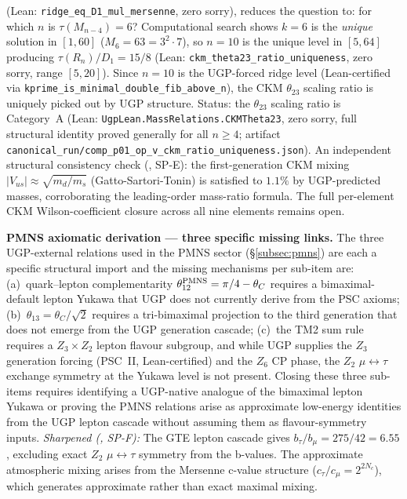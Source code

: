 \documentclass[11pt]{article}
\theoremstyle{remark}
\begin{document}
{\begin{description}[leftmargin=2em,labelindent=0.5em,itemsep=0.28em]
  (Lean: \texttt{ridge\_eq\_D1\_mul\_mersenne}, zero sorry), reduces the
  question to: for which $n$ is $\tau(M_{n-4}) = 6$?  Computational search shows
  $k = 6$ is the \emph{unique} solution in $[1, 60]$ ($M_6 = 63 = 3^2 \cdot 7$),
  so $n = 10$ is the unique level in $[5, 64]$ producing $\tau(R_n)/D_1 = 15/8$
  (Lean: \texttt{ckm\_theta23\_ratio\_uniqueness}, zero sorry, range $[5, 20]$).
  Since $n = 10$ is the UGP-forced ridge level (Lean-certified via
  \texttt{kprime\_is\_minimal\_double\_fib\_above\_n}), the CKM $\theta_{23}$
  scaling ratio is uniquely picked out by UGP structure.
  Status: the $\theta_{23}$ scaling ratio is Category~A
  (Lean: \texttt{UgpLean.MassRelations.CKMTheta23}, zero sorry,
  full structural identity proved generally for all $n \ge 4$;
  artifact \texttt{canonical\_run/comp\_p01\_op\_v\_ckm\_ratio\_uniqueness.json}).
  An independent structural consistency check (\cite{Spivack2026_Uniqueness25}, SP-E):
  the first-generation CKM mixing $|V_{us}| \approx \sqrt{m_d/m_s}$ (Gatto-Sartori-Tonin)
  is satisfied to $1.1\%$ by UGP-predicted masses, corroborating the leading-order mass-ratio
  formula.  The full per-element CKM Wilson-coefficient closure across all nine elements
  remains open.
  \item[(v$'$)] \textbf{PMNS axiomatic derivation --- three specific missing links.} The three UGP-external relations used in the PMNS sector (\S\ref{subsec:pmns}) are each a specific structural import and the missing mechanisms per sub-item are: (a)~quark--lepton complementarity $\theta_{12}^{\rm PMNS} = \pi/4 - \theta_C$ requires a bimaximal-default lepton Yukawa that UGP does not currently derive from the PSC axioms; (b)~$\theta_{13} = \theta_C/\sqrt{2}$ requires a tri-bimaximal projection to the third generation that does not emerge from the UGP generation cascade; (c)~the TM2 sum rule requires a $Z_3 \times Z_2$ lepton flavour subgroup, and while UGP supplies the $Z_3$ generation forcing (PSC~II, Lean-certified) and the $Z_6$ CP phase, the $Z_2$ $\mu\leftrightarrow\tau$ exchange symmetry at the Yukawa level is not present.  Closing these three sub-items requires identifying a UGP-native analogue of the bimaximal lepton Yukawa or proving the PMNS relations arise as approximate low-energy identities from the UGP lepton cascade without assuming them as flavour-symmetry inputs.
  \emph{Sharpened (\cite{Spivack2026_Uniqueness25}, SP-F):} The GTE lepton cascade gives $b_\tau/b_\mu = 275/42 = 6.55$, excluding exact $Z_2$ $\mu\leftrightarrow\tau$ symmetry from the b-values.  The approximate atmospheric mixing arises from the Mersenne c-value structure ($c_\tau/c_\mu = 2^{2N_c}$), which generates approximate rather than exact maximal mixing.

\end{description}}
\end{document}
